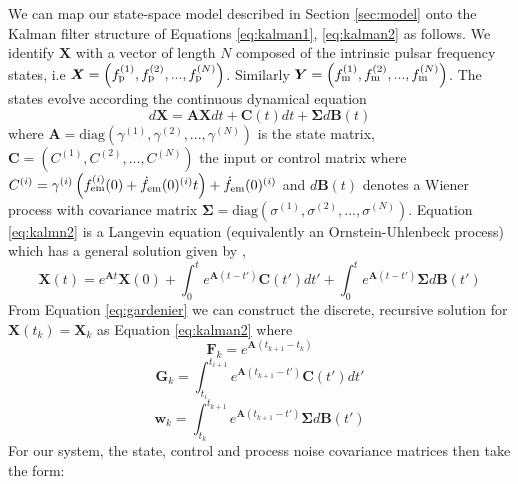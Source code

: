 \documentclass[fleqn,usenatbib,useAMS]{mnras}
\begin{document}
We can map our state-space model described in Section \ref{sec:model} onto the Kalman filter structure of Equations  
\ref{eq:kalman1}, \ref{eq:kalman2} as follows. We identify $\boldsymbol{X}$ with a vector of length $N$ composed of the intrinsic pulsar frequency states, i.e $\boldsymbol{X} = \left(f_{\rm p}^{(1)}, f_{\rm p}^{(2)}, ..., f_{\rm p}^{(N)}\right)$. Similarly  $\boldsymbol{Y} = \left(f_{\rm m}^{(1)}, f_{\rm m}^{(2)}, ..., f_{\rm m}^{(N)} \right)$. The states evolve according the continuous dynamical equation
\begin{equation}
	d \boldsymbol{X} = \boldsymbol{A} \boldsymbol{X} dt + \boldsymbol{C}(t) dt + \boldsymbol{\Sigma} d \boldsymbol{B}(t) \label{eq:kalmn2}
\end{equation}
where $\boldsymbol{A} = \text{diag} \left(\gamma^{(1)}, \gamma^{(2)}, ..., \gamma^{(N)}\right)$ is the state matrix, $\boldsymbol{C} = \left(C^{(1)}, C^{(2)}, ..., C^{(N)}\right)$ the input or control matrix where $C^{(i)} =\gamma^{(i)} \left(f_{\rm em}^{(i)} (0) + \dot{f}_{\rm em}(0)^{(i)} t \right) +  \dot{f}_{\rm em}(0)^{(i)}$ and $d\boldsymbol{B}(t)$ denotes a Wiener process with covariance matrix $\boldsymbol{\Sigma} = \text{diag} \left(\sigma^{(1)}, \sigma^{(2)}, ..., \sigma^{(N)}\right)$. Equation \ref{eq:kalmn2} is a Langevin equation (equivalently an Ornstein-Uhlenbeck process) which has a general solution given by \citep{gardiner2009stochastic},
\begin{equation}
	\boldsymbol{X}(t) = e^{\boldsymbol{A} t} \boldsymbol{X}(0) + \int_0^t e^{\boldsymbol{A}(t-t')} \boldsymbol{C}(t') dt' + \int_0^t e^{\boldsymbol{A}(t-t')} \boldsymbol{\Sigma} d\boldsymbol{B}(t') \label{eq:gardenier}
\end{equation} 
From Equation \ref{eq:gardenier} we can construct the discrete, recursive solution for $\boldsymbol{X}(t_k) = \boldsymbol{X}_k$ as Equation \ref{eq:kalman2} where
\begin{equation}
\boldsymbol{F}_k = e^{\boldsymbol{A}\left( t_{k+1} - t_k \right)} 
\end{equation}
\begin{equation}
	\boldsymbol{G}_k = \int_{t_i}^{t_{i+1}}  e^{\boldsymbol{A}\left( t_{k+1} - t' \right)}  \boldsymbol{C}(t') dt' 
\end{equation}
\begin{equation}
	\boldsymbol{w}_k = \int_{t_k}^{t_{k+1}} e^{\boldsymbol{A}\left( t_{k+1} - t' \right)} \boldsymbol{\Sigma} d \boldsymbol{B}(t')
	\end{equation}
For our system, the state, control and process noise covariance matrices then take the form:
\end{document}
